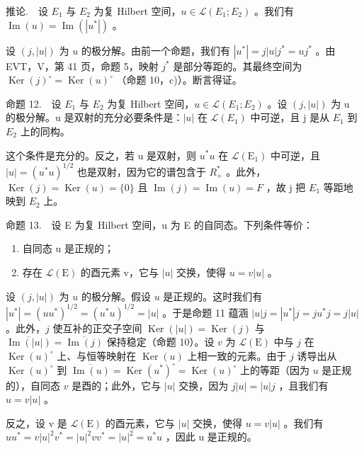 推论.　设 \(E_{1}\) 与 \(E_{2}\) 为复 Hilbert 空间，\(u \in \mathcal{L}(E_{1}; E_{2})\) 。我们有 \(\operatorname{Im}(u) = \operatorname{Im}(|u^{*}|)\) 。

设 \((j, |u|)\) 为 \(u\) 的极分解。由前一个命题，我们有 \(|u^{*}| = j|u|j^{*} = uj^{*}\) 。由 EVT，V，第 41 页，命题 5，映射 \(j^{*}\) 是部分等距的。其最终空间为 \(\operatorname{Ker}(j)^{\circ} = \operatorname{Ker}(u)^{\circ}\) （命题 10，c)）。断言得证。

命题 12.　设 \(E_{1}\) 与 \(E_{2}\) 为复 Hilbert 空间，\(u \in \mathcal{L}(E_{1}; E_{2})\) 。设 \((j, |u|)\) 为 u 的极分解。u 是双射的充分必要条件是：\(|u|\) 在 \(\mathcal{L}(E_{1})\) 中可逆，且 j 是从 \(E_{1}\) 到 \(E_{2}\) 上的同构。

这个条件是充分的。反之，若 u 是双射，则 \(u^{*}u\) 在 \(\mathcal{L}(\mathrm{E}_{1})\) 中可逆，且 \(|u| = (u^{*}u)^{1/2}\) 也是双射，因为它的谱包含于 \(R_{+}^{*}\) 。此外，\(\operatorname{Ker}(j) = \operatorname{Ker}(u) = \{0\}\) 且 \(\operatorname{Im}(j) = \operatorname{Im}(u) = F\) ，故 j 把 \(E_{1}\) 等距地映到 \(E_{2}\) 上。

命题 13.　设 E 为复 Hilbert 空间，u 为 E 的自同态。下列条件等价：

\begin{enumerate}
\def\labelenumi{(\roman{enumi})}
\item
  自同态 u 是正规的；
\item
  存在 \(\mathcal{L}(\mathrm{E})\) 的酉元素 v，它与 \(|u|\) 交换，使得 \(u = v|u|\) 。
\end{enumerate}

设 \((j,|u|)\) 为 \(u\) 的极分解。假设 \(u\) 是正规的。这时我们有 \(|u^{*}| = (uu^{*})^{1/2} = (u^{*}u)^{1/2} = |u|\) 。于是命题 11 蕴涵 \(|u|j = |u^{*}|j = ju^{*}j = j|u|\) 。此外，\(j\) 使互补的正交子空间 \(\operatorname{Ker}(|u|) = \operatorname{Ker}(j)\) 与 \(\overline{\operatorname{Im}(|u|)} = \overline{\operatorname{Im}(j)}\) 保持稳定（命题 10）。设 \(v\) 为 \(\mathcal{L}(\mathrm{E})\) 中与 \(j\) 在 \(\operatorname{Ker}(u)^{\circ}\) 上、与恒等映射在 \(\operatorname{Ker}(u)\) 上相一致的元素。由于 \(j\) 诱导出从 \(\operatorname{Ker}(u)^{\circ}\) 到 \(\overline{\operatorname{Im}(u)} = \operatorname{Ker}(u^{*})^{\circ} = \operatorname{Ker}(u)^{\circ}\) 上的等距（因为 \(u\) 是正规的），自同态 \(v\) 是酉的；此外，它与 \(|u|\) 交换，因为 \(j|u| = |u|j\) ，且我们有 \(u = v|u|\) 。

反之，设 v 是 \(\mathcal{L}(\mathrm{E})\) 的酉元素，它与 \(|u|\) 交换，使得 \(u = v|u|\) 。我们有 \(uu^{*} = v|u|^{2}v^{*} = |u|^{2}vv^{*} = |u|^{2} = u^{*}u\) ，因此 u 是正规的。

